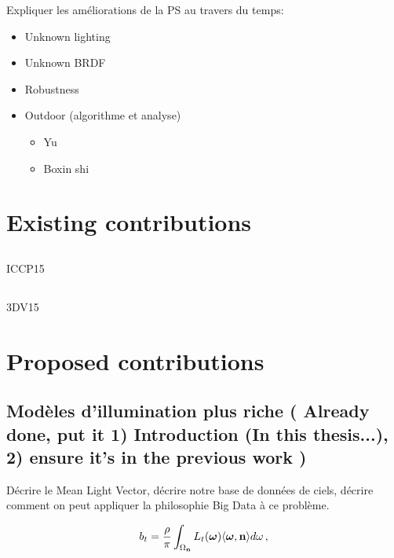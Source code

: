 \documentclass{report}
\begin{document}
Expliquer les améliorations de la PS au travers du temps:
\begin{itemize}
	\item Unknown lighting
	\item Unknown BRDF
	\item Robustness
	\item Outdoor (algorithme et analyse)
	\begin{itemize}
		\item Yu
		\item Boxin shi
	\end{itemize}
\end{itemize}



\chapter{Existing contributions}


\section{}
ICCP15

\section{}
3DV15


\chapter{Proposed contributions}

\section{Modèles d'illumination plus riche ( Already done, put it 1) Introduction (In this thesis...), 2) ensure it's in the previous work )}

Décrire le Mean Light Vector, décrire notre base de données de ciels, décrire comment on peut appliquer la philosophie Big Data à ce problème.

\begin{equation}
b_t = \frac{\rho}{\pi} \int_{\Omega_{\bf n}} L_t(\mathbf{\boldsymbol \omega}) \langle \boldsymbol \omega, {\bf n} \rangle d\omega \,,
\end{equation}
\end{document}
